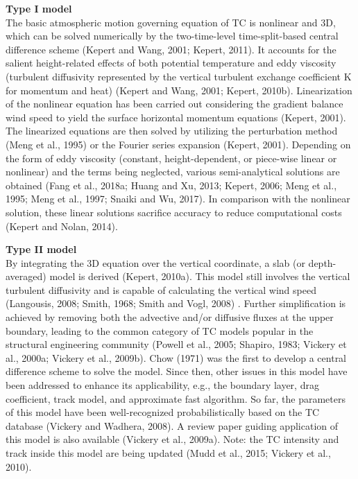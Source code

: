 \noindent\textbf{Type I model} \\The basic atmospheric motion governing equation of TC is nonlinear and 3D, which can be solved numerically by the two-time-level time-split-based central difference scheme (Kepert and Wang, 2001; Kepert, 2011). It accounts for the salient height-related effects of both potential temperature and eddy viscosity (turbulent diffusivity represented by the vertical turbulent exchange coefficient K for momentum and heat) (Kepert and Wang, 2001; Kepert, 2010b). Linearization of the nonlinear equation has been carried out considering the gradient balance wind speed to yield the surface horizontal momentum equations (Kepert, 2001). The linearized equations are then solved by utilizing the perturbation method (Meng et al., 1995) or the Fourier series expansion (Kepert, 2001). Depending on the form of eddy viscosity (constant, height-dependent, or piece-wise linear or nonlinear) and the terms being neglected, various semi-analytical solutions are obtained (Fang et al., 2018a; Huang and Xu, 2013; Kepert, 2006; Meng et al., 1995; Meng et al., 1997; Snaiki and Wu, 2017). In comparison with the nonlinear solution, these linear solutions sacrifice accuracy to reduce computational costs (Kepert and Nolan, 2014). 
\newline

\noindent\textbf{Type II model} \\By integrating the 3D equation over the vertical coordinate, a slab (or depth-averaged) model is derived (Kepert, 2010a). This model still involves the vertical turbulent diffusivity and is capable of calculating the vertical wind speed (Langousis, 2008; Smith, 1968; Smith and Vogl, 2008) . Further simplification is achieved by removing both the advective and/or diffusive fluxes at the upper boundary, leading to the common category of TC models popular in the structural engineering community (Powell et al., 2005; Shapiro, 1983; Vickery et al., 2000a; Vickery et al., 2009b). Chow (1971) was the first to develop a central difference scheme to solve the model. Since then, other issues in this model have been addressed to enhance its applicability, e.g., the boundary layer, drag coefficient, track model, and approximate fast algorithm. So far, the parameters of this model have been well-recognized probabilistically based on the TC database (Vickery and Wadhera, 2008). A review paper guiding application of this model is also available (Vickery et al., 2009a). Note: the TC intensity and track inside this model are being updated (Mudd et al., 2015; Vickery et al., 2010). 
\newline


